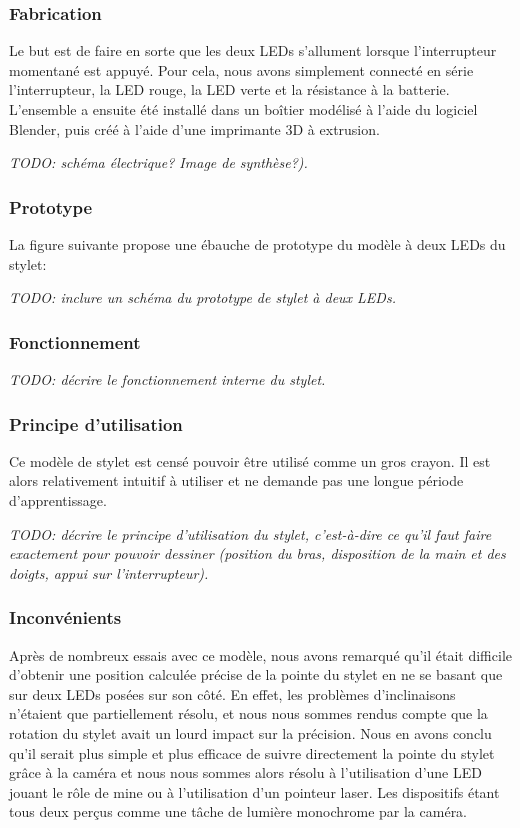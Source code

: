 \documentclass[11pt,a4paper,oldfontcommands]{memoir}
\begin{document}
\subsubsection{Fabrication}

Le but est de faire en sorte que les deux LEDs s'allument lorsque l'interrupteur momentané est appuyé. Pour cela, nous avons simplement connecté en série l'interrupteur, la LED rouge, la LED verte et la résistance à la batterie.
L'ensemble a ensuite été installé dans un boîtier modélisé à l'aide du logiciel Blender, puis créé à l'aide d'une imprimante 3D à extrusion.

\textit{TODO: schéma électrique? Image de synthèse?).}

\subsubsection{Prototype}

La figure suivante propose une ébauche de prototype du modèle à deux LEDs du stylet:

\textit{TODO: inclure un schéma du prototype de stylet à deux LEDs.}

\subsubsection{Fonctionnement}

\textit{TODO: décrire le fonctionnement interne du stylet.}

\subsubsection{Principe d'utilisation}

Ce modèle de stylet est censé pouvoir être utilisé comme un gros crayon. Il est alors relativement intuitif à utiliser et ne demande pas une longue période d'apprentissage.

\textit{TODO: décrire le principe d'utilisation du stylet, c'est-à-dire ce qu'il faut faire exactement pour pouvoir dessiner (position du bras, disposition de la main et des doigts, appui sur l'interrupteur).}

\subsubsection{Inconvénients}
Après de nombreux essais avec ce modèle, nous avons remarqué qu'il était difficile d'obtenir une position calculée précise de la pointe du stylet en ne se basant que sur deux LEDs posées sur son côté. En effet, les problèmes d'inclinaisons n'étaient que partiellement résolu, et nous nous sommes rendus compte que la rotation du stylet avait un lourd impact sur la précision.
Nous en avons conclu qu'il serait plus simple et plus efficace de suivre directement la pointe du stylet grâce à la caméra et nous nous sommes alors résolu à l'utilisation d'une LED jouant le rôle de mine ou à l'utilisation d'un pointeur laser. Les dispositifs étant tous deux perçus comme une tâche de lumière monochrome par la caméra.
\end{document}
